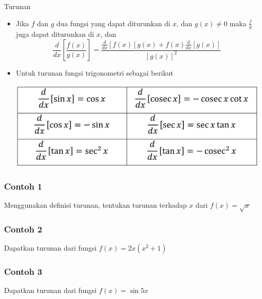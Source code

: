 \documentclass[pdflatex,compress,mathserif]{beamer}
\begin{document}
	\begin{frame}{Turunan}
		\begin{itemize}
			\item Jika $ f $ dan $ g $ dua fungsi yang dapat diturunkan di $ x $, dan $ g(x) \neq 0 $ maka $ \frac{f}{g} $ juga dapat diturunkan di $ x $, dan
			\begin{equation}
				\frac{d}{dx}\left[ \frac{f(x)}{g(x)} \right] = \frac{\frac{d}{dx}[f(x)]g(x) + f(x)\frac{d}{dx}[g(x)]}{[g(x)]^2}
			\end{equation}
			\item Untuk turunan fungsi trigonometri sebagai berikut
			\begin{center}
				\includegraphics[width=0.7\linewidth]{pict/34}
			\end{center}
		\end{itemize}
	\end{frame}

	\begin{frame}
		\frametitle{Contoh 1}
		Menggunakan definisi turunan, tentukan turunan terhadap $ x $ dari $ f(x) = \sqrt{x} $
		\vfill\null
	\end{frame}

	\begin{frame}
		\frametitle{Contoh 2}
		Dapatkan turunan dari fungsi $ f(x) = 2x(x^2 + 1) $
		\vfill\null
	\end{frame}

	\begin{frame}
		\frametitle{Contoh 3}
		Dapatkan turunan dari fungsi $ f(x) = \sin5x $
		\vfill\null
	\end{frame}
\end{document}
